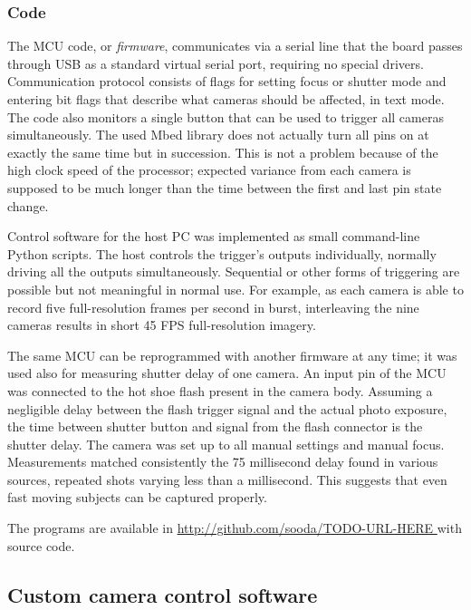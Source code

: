 \subsubsection{Code}

The MCU code, or \emph{firmware}, communicates via a serial line that the board passes through USB as a standard virtual serial port, requiring no special drivers.
Communication protocol consists of flags for setting focus or shutter mode and entering bit flags that describe what cameras should be affected, in text mode.
The code also monitors a single button that can be used to trigger all cameras simultaneously.
The used Mbed library does not actually turn all pins on at exactly the same time but in succession.
This is not a problem because of the high clock speed of the processor; expected variance from each camera is supposed to be much longer than the time between the first and last pin state change. %

Control software for the host PC was implemented as small command-line Python scripts.
The host controls the trigger's outputs individually, normally driving all the outputs simultaneously.
Sequential or other forms of triggering are possible but not meaningful in normal use.
For example, as each camera is able to record five full-resolution frames per second in burst, interleaving the nine cameras results in short 45 FPS full-resolution imagery.

The same MCU can be reprogrammed with another firmware at any time; it was used also for measuring shutter delay of one camera.
An input pin of the MCU was connected to the hot shoe flash present in the camera body.
Assuming a negligible delay between the flash trigger signal and the actual photo exposure, the time between shutter button and signal from the flash connector is the shutter delay.
The camera was set up to all manual settings and manual focus.
Measurements matched consistently the 75 millisecond delay found in various sources, repeated shots varying less than a millisecond.
This suggests that even fast moving subjects can be captured properly.

The programs are available in \url { http://github.com/sooda/TODO-URL-HERE } with source code.


\subsection{Custom camera control software} %

